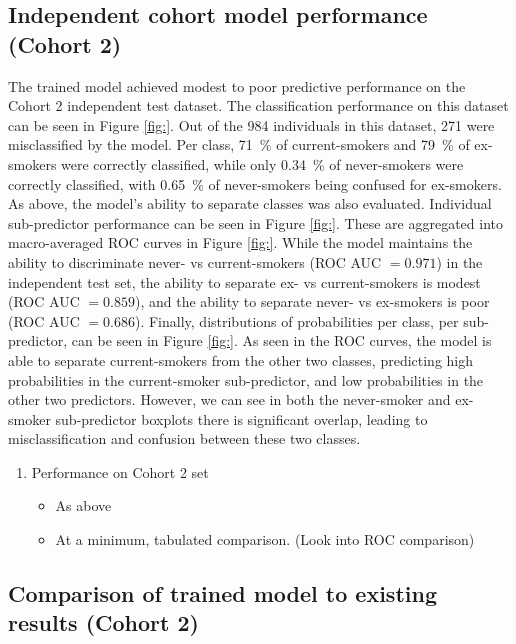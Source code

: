 \documentclass{article}
\begin{document}
\subsection{Independent cohort model performance (Cohort 2)} \label{sec:cohort2-performance}
The trained model achieved modest to poor predictive performance on the Cohort 2 independent test dataset. The classification performance on this dataset can be seen in Figure \ref{fig:}. Out of the 984 individuals in this dataset, 271 were misclassified by the model. Per class, \SI{71}{\percent} of current-smokers and \SI{79}{\percent} of ex-smokers were correctly classified, while only \SI{0.34}{\percent} of never-smokers were correctly classified, with \SI{0.65}{\percent} of never-smokers being confused for ex-smokers. As above, the model's ability to separate classes was also evaluated. Individual sub-predictor performance can be seen in Figure \ref{fig:}. These are aggregated into macro-averaged ROC curves in Figure \ref{fig:}. While the model maintains the ability to discriminate never- vs current-smokers (ROC AUC \(=0.971\)) in the independent test set, the ability to separate ex- vs current-smokers is modest (ROC AUC \(=0.859\)), and the ability to separate never- vs ex-smokers is poor (ROC AUC \(=0.686\)). Finally, distributions of probabilities per class, per sub-predictor, can be seen in Figure \ref{fig:}. As seen in the ROC curves, the model is able to separate current-smokers from the other two classes, predicting high probabilities in the current-smoker sub-predictor, and low probabilities in the other two predictors. However, we can see in both the never-smoker and ex-smoker sub-predictor boxplots there is significant overlap, leading to misclassification and confusion between these two classes.

\begin{enumerate}
    \item Performance on Cohort 2 set
          \begin{itemize}
              \item As above
              \item At a minimum, tabulated comparison. (Look into ROC comparison)
          \end{itemize}
\end{enumerate}


\subsection{Comparison of trained model to existing results (Cohort 2)} \label{sec:model-comparisons}
\end{document}

